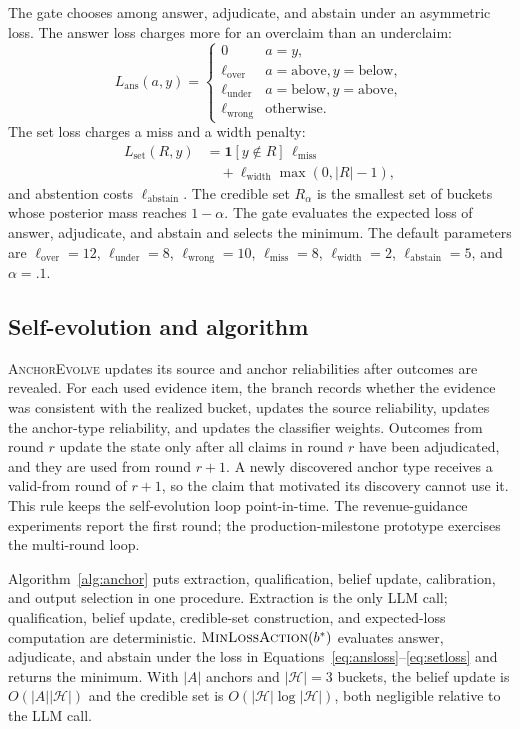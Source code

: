 \documentclass[11pt]{article}
\newcommand{\anchor}{\textsc{AnchorEvolve}}
\newcommand{\indic}{\mathbf{1}}
\begin{document}
The gate chooses among answer, adjudicate, and abstain under an asymmetric loss. The answer loss charges more for an overclaim than an underclaim:
\begin{equation}
\label{eq:ansloss}
L_{\text{ans}}(a,y)=
\begin{cases}
0 & a=y,\\
\ell_{\text{over}} & a=\text{above}, y=\text{below},\\
\ell_{\text{under}} & a=\text{below}, y=\text{above},\\
\ell_{\text{wrong}} & \text{otherwise}.
\end{cases}
\end{equation}
The set loss charges a miss and a width penalty:
\begin{equation}
\label{eq:setloss}
\begin{aligned}
L_{\text{set}}(R,y)&=\indic[y\notin R]\,\ell_{\text{miss}}\\
&\quad+\ell_{\text{width}}\max(0,|R|-1),
\end{aligned}
\end{equation}
and abstention costs $\ell_{\text{abstain}}$. The credible set $R_\alpha$ is the smallest set of buckets whose posterior mass reaches $1-\alpha$. The gate evaluates the expected loss of answer, adjudicate, and abstain and selects the minimum. The default parameters are $\ell_{\text{over}}=12$, $\ell_{\text{under}}=8$, $\ell_{\text{wrong}}=10$, $\ell_{\text{miss}}=8$, $\ell_{\text{width}}=2$, $\ell_{\text{abstain}}=5$, and $\alpha=.1$.

\subsection{Self-evolution and algorithm}
\anchor{} updates its source and anchor reliabilities after outcomes are revealed. For each used evidence item, the branch records whether the evidence was consistent with the realized bucket, updates the source reliability, updates the anchor-type reliability, and updates the classifier weights. Outcomes from round $r$ update the state only after all claims in round $r$ have been adjudicated, and they are used from round $r+1$. A newly discovered anchor type receives a valid-from round of $r+1$, so the claim that motivated its discovery cannot use it. This rule keeps the self-evolution loop point-in-time. The revenue-guidance experiments report the first round; the production-milestone prototype exercises the multi-round loop.

Algorithm~\ref{alg:anchor} puts extraction, qualification, belief update, calibration, and output selection in one procedure. Extraction is the only LLM call; qualification, belief update, credible-set construction, and expected-loss computation are deterministic. $\textsc{MinLossAction}(b^*)$ evaluates answer, adjudicate, and abstain under the loss in Equations~\ref{eq:ansloss}--\ref{eq:setloss} and returns the minimum. With $|A|$ anchors and $|\mathcal H|=3$ buckets, the belief update is $O(|A||\mathcal H|)$ and the credible set is $O(|\mathcal H|\log|\mathcal H|)$, both negligible relative to the LLM call.
\end{document}
